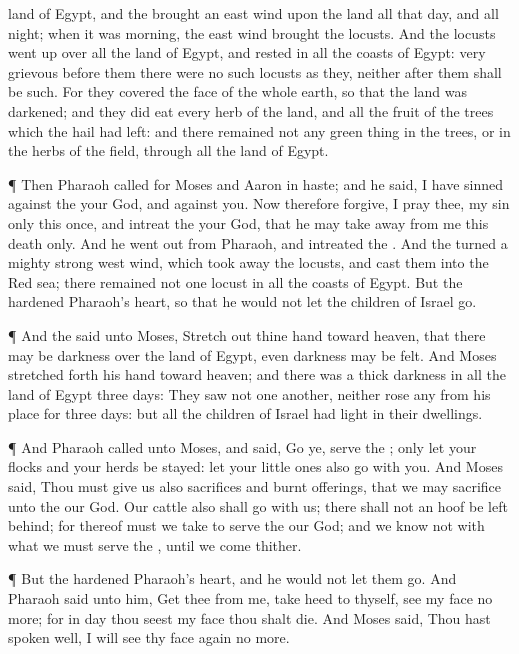 {land of
Egypt, and the
{}
brought an
east
wind upon the
land all that
day, and all
{}
night;
{} when it was
morning, the
east
wind
brought the
locusts.
And the
locusts went
up over all the
land of
Egypt, and
rested in all the
coasts of
Egypt:
very
grievous
{}
before them there were no
such
locusts as they, neither
after them shall be such.
For they
covered the
face of the whole
earth, so that the
land was
darkened; and they did
eat every
herb of the
land, and all the
fruit of the
trees which the
hail had
left: and there
remained not any green
thing in the
trees, or in the
herbs of the
field, through all the
land of
Egypt.
\par }{\PP {}¶ Then
Pharaoh
called for
Moses and
Aaron in
haste; and he
said, I have
sinned against the
{} your
God, and against you.
Now therefore
forgive, I pray thee, my
sin only this
once, and
intreat the
{} your
God, that he may take
away from me this
death only.
And he went
out from
Pharaoh, and
intreated the
{}.
And the
{}
turned a
mighty
strong
west
wind, which took
away the
locusts, and
cast them into the
Red
sea; there
remained not
one
locust in all the
coasts of
Egypt.
But the
{}
hardened
Pharaoh’s
heart, so that he would not let the
children of
Israel
go.
\par }{\PP {}¶ And the
{}
said unto
Moses, Stretch
out thine
hand toward
heaven, that there may be
darkness over the
land of
Egypt, even
darkness
{} may be
felt.
And
Moses stretched
forth his
hand toward
heaven; and there was a
thick
darkness in all the
land of
Egypt
three
days:
They
saw not
one
another, neither
rose
any from his place for
three
days: but all the
children of
Israel had
light in their
dwellings.
\par }{\PP {}¶ And
Pharaoh
called unto
Moses, and
said,
Go ye,
serve the
{}; only let your
flocks and your
herds be
stayed: let your little
ones also
go with you.
And
Moses
said, Thou must
give
us also
sacrifices and burnt
offerings, that we may
sacrifice unto the
{} our
God.
Our
cattle also shall
go with us; there shall not an
hoof be left
behind; for thereof must we
take to
serve the
{} our
God; and we
know not with what we must
serve the
{}, until we
come thither.
\par }{\PP {}¶ But the
{}
hardened
Pharaoh’s
heart, and he
would not let them
go.
And
Pharaoh
said unto him,
Get thee from me, take
heed to thyself,
see my
face no
more; for in
{}
day thou
seest my
face thou shalt
die.
And
Moses
said, Thou hast
spoken
well, I will
see thy
face
again no more.

}
